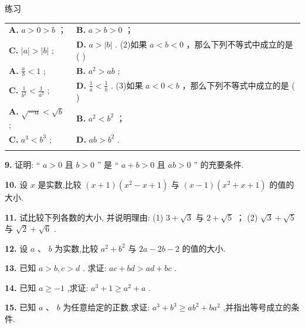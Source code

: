 \documentclass[a4paper,10pt,oneside,fontset=none]{ctexbook}
\renewcommand{\geq}{\geqslant}
\newenvironment{exercise}[1][]{\begin{exBox}{练习}{#1}}{\end{exBox}}
\numberwithin{equation}{chapter}
\begin{document}
\begin{exercise}
\begin{center}
\begin{tabular}{@{}p{}p{}@{}}
\textbf{A.} $a > 0 > b$ ； & \textbf{B.} $a > b > 0$ ； \\\vspace{0.2em}
\textbf{C.} $\left| a\right|  > \left| b\right|$ ; & \textbf{D.} $a > \left| b\right|$ . (2)如果 $a < b < 0$ ，那么下列不等式中成立的是 ( ) \\\vspace{0.2em}
\textbf{A.} $\frac{a}{b} < 1$ ; & \textbf{B.} ${a}^{2} > {ab}$ ; \\\vspace{0.2em}
\textbf{C.} $\frac{1}{{b}^{2}} < \frac{1}{{a}^{2}}$ ; & \textbf{D.} $\frac{1}{a} < \frac{1}{b}$ . (3)如果 $a < 0 < b$ ，那么下列不等式中成立的是 ( ) \\\vspace{0.2em}
\textbf{A.} $\sqrt{-a} < \sqrt{b}$ ; & \textbf{B.} ${a}^{2} < {b}^{2}$ ； \\\vspace{0.2em}
\textbf{C.} ${a}^{3} < {b}^{3}$ ; & \textbf{D.} ${ab} > {b}^{2}$ . \\\vspace{0.2em}
\end{tabular}
\end{center}
\par\vspace{0.8em}
\textbf{9.} 证明: “ $a > 0$ 且 $b > 0$ ” 是 “ $a + b > 0$ 且 ${ab} > 0$ ” 的充要条件.
\par\vspace{0.8em}
\textbf{10.} 设 $x$ 是实数,比较 $\left( {x + 1}\right) \left( {{x}^{2} - x + 1}\right)$ 与 $\left( {x - 1}\right) \left( {{x}^{2} + x + 1}\right)$ 的值的大小.
\par\vspace{0.8em}
\textbf{11.} 试比较下列各数的大小, 并说明理由: (1) $3 + \sqrt{3}$ 与 $2 + \sqrt{5}$ ； (2) $\sqrt{3} + \sqrt{5}$ 与 $\sqrt{2} + \sqrt{6}$ .
\par\vspace{0.8em}
\textbf{12.} 设 $a\text{ 、 }b$ 为实数,比较 ${a}^{2} + {b}^{2}$ 与 ${2a} - {2b} - 2$ 的值的大小.
\par\vspace{0.8em}
\textbf{13.} 已知 $a > b, c > d$ . 求证: ${ac} + {bd} > {ad} + {bc}$ .
\par\vspace{0.8em}
\textbf{14.} 已知 $a \geq   - 1$ ,求证: ${a}^{3} + 1 \geq  {a}^{2} + a$ .
\par\vspace{0.8em}
\textbf{15.} 已知 $a\text{ 、 }b$ 为任意给定的正数,求证: ${a}^{3} + {b}^{3} \geq  a{b}^{2} + b{a}^{2}$ ,并指出等号成立的条件.
\end{exercise}
\end{document}
